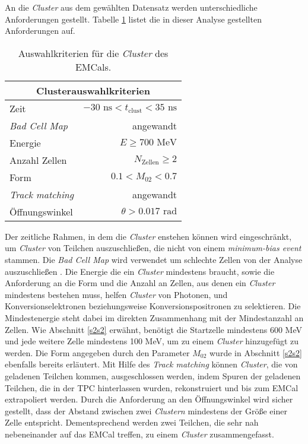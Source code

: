 An die \textit{Cluster} aus dem gewählten Datensatz werden unterschiedliche Anforderungen gestellt.
Tabelle \ref{tab:Cluster} listet die in dieser Analyse gestellten Anforderungen auf.
\begin{table}[b]
\centering
\begin{tabular}{|l|r|}
\hline
\multicolumn{2}{|c|}{Clusterauswahlkriterien}                   \\ \hline \hline
Zeit                    & $-30\text{ ns} < t_\text{clust}<35\text{ ns}$ \\ \hline
\textit{Bad Cell Map}   & angewandt                                     \\ \hline
Energie                 & $E\geq700\text{ MeV}$                         \\ \hline
Anzahl Zellen           & $N_\text{Zellen}\geq 2$                       \\ \hline
Form                    & $0.1< M_{02}<0.7$                             \\ \hline
\textit{Track matching} & angewandt                                     \\ \hline
Öffnungswinkel          & $\theta>0.017\text{ rad}$                     \\ \hline
\end{tabular}
\caption{Auswahlkriterien für die \textit{Cluster} des EMCals.}
\label{tab:Cluster}
\end{table}
\newline
Der zeitliche Rahmen, in dem die \textit{Cluster} enstehen können wird eingeschränkt, um \textit{Cluster} von Teilchen auszuschließen, die nicht von einem \textit{minimum-bias event} stammen.
Die \textit{Bad Cell Map} wird verwendet um schlechte Zellen von der Analyse auszuschließen \cite{thesis:Joshua}.
\newline
Die Energie die ein \textit{Cluster} mindestens braucht, sowie die Anforderung an die Form und die Anzahl an Zellen, aus denen ein \textit{Cluster} mindestens bestehen muss, helfen \textit{Cluster} von Photonen, und Konversionselektronen beziehungsweise Konversionspositronen zu selektieren.
Die Mindestenergie steht dabei im direkten Zusammenhang mit der Mindestanzahl an Zellen.
Wie Abschnitt \ref{s2s2} erwähnt, benötigt die Startzelle mindestens 600 MeV und jede weitere Zelle mindestens 100 MeV, um zu einem \textit{Cluster} hinzugefügt zu werden.
Die Form angegeben durch den Parameter $M_{02}$ wurde in Abschnitt \ref{s2s2} ebenfalls bereits erläutert.
Mit Hilfe des \textit{Track matching} können \textit{Cluster}, die von geladenen Teilchen kommen, ausgeschlossen werden, indem Spuren der geladenen Teilchen, die in der TPC hinterlassen wurden, rekonstruiert und bis zum EMCal extrapoliert werden.
\newline
Durch die Anforderung an den Öffnungswinkel wird sicher gestellt, dass der Abstand zwischen zwei \textit{Clustern} mindestens der Größe einer Zelle entspricht.
Dementsprechend werden zwei Teilchen, die sehr nah nebeneinander auf das EMCal treffen, zu einem \textit{Cluster} zusammengefasst.
\newline

